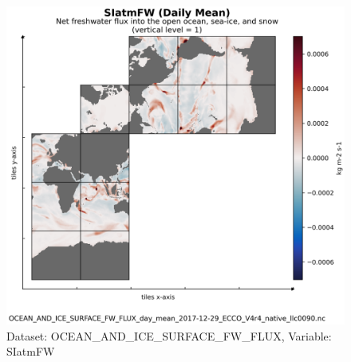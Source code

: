 \begin{figure}[H]
\centering
\includegraphics[scale=0.55]{../images/plots/v4r4/native_plots/Ocean_and_Sea-Ice_Surface_Freshwater_Fluxes/SIatmFW.png}
\caption{Dataset: OCEAN\_AND\_ICE\_SURFACE\_FW\_FLUX, Variable: SIatmFW}
\label{tab:table-OCEAN_AND_ICE_SURFACE_FW_FLUX_SIatmFW-Plot}
\end{figure}
\newpage
\pagebreak
